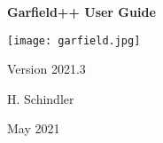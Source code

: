 \begin{titlepage}
  {
  \centering
  \sffamily
  \linespread{1.5}

  \vspace{3cm} 

  \huge{\textbf{Garfield++ User Guide}}

  \vspace{2cm}

  \texttt{[image: garfield.jpg]}

  \vspace{2cm}

  \large
  Version 2021.3

  \vspace{2cm}
  \large
  H. Schindler

  \vfill

  May 2021

  }
\end{titlepage}
